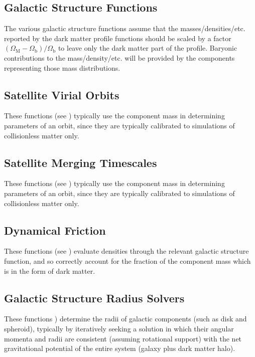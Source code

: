 \subsection{Galactic Structure Functions}

The various galactic structure functions assume that the masses/densities/etc. reported by the dark matter profile functions should be scaled by a factor $(\Omega_\mathrm{M}-\Omega_\mathrm{b})/\Omega_\mathrm{b}$ to leave only the dark matter part of the profile. Baryonic contributions to the mass/density/etc. will be provided by the components representing those mass distributions.

\subsection{Satellite Virial Orbits}

These functions (see ) typically use the  component mass in determining parameters of an orbit, since they are typically calibrated to simulations of collisionless matter only.

\subsection{Satellite Merging Timescales}

These functions (see ) typically use the  component mass in determining parameters of an orbit, since they are typically calibrated to simulations of collisionless matter only.

\subsection{Dynamical Friction}

These functions (see ) evaluate densities through the relevant galactic structure function, and so correctly account for the fraction of the  component mass which is in the form of dark matter.

\subsection{Galactic Structure Radius Solvers}

These functions ) determine the radii of galactic components (such as disk and spheroid), typically by iteratively seeking a solution in which their angular momenta and radii are consistent (assuming rotational support) with the net gravitational potential of the entire system (galaxy plus dark matter halo).


